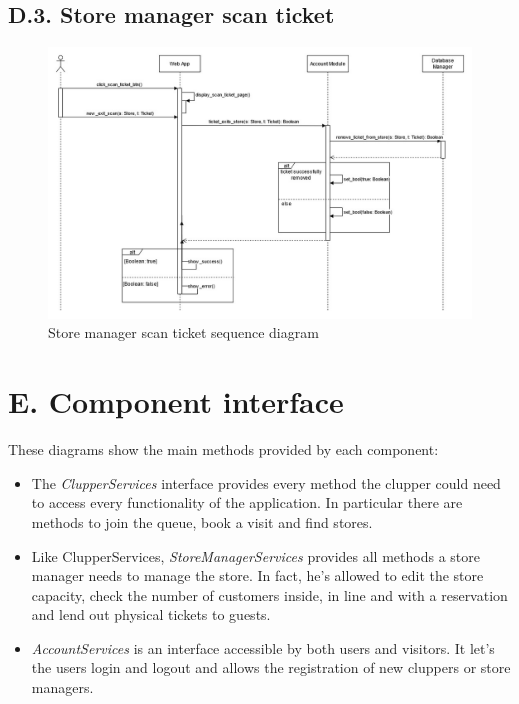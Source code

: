 \subsection{D.3. Store manager scan ticket}

\begin{figure}[H]
\centering
\includegraphics{assets/dd/sequence_diagrams/store_manager_scan_sequence_diagram}
\caption{Store manager scan ticket sequence diagram}
\end{figure}

\section{E. Component interface}

These diagrams show the main methods provided by each component:
\begin{itemize}
\item
    The \emph{ClupperServices} interface provides every method the clupper could need to access every functionality of the application. In particular there are methods to join the queue, book a visit and find stores.
\item
    Like ClupperServices, \emph{StoreManagerServices} provides all methods a store manager needs to manage the store. In fact, he's allowed to edit the store capacity, check the number of customers inside, in line and with a reservation and lend out physical tickets to guests.
\item
    \emph{AccountServices} is an interface accessible by both users and visitors. It let's the users login and logout and allows the registration of new cluppers or store managers.
\end{itemize}

